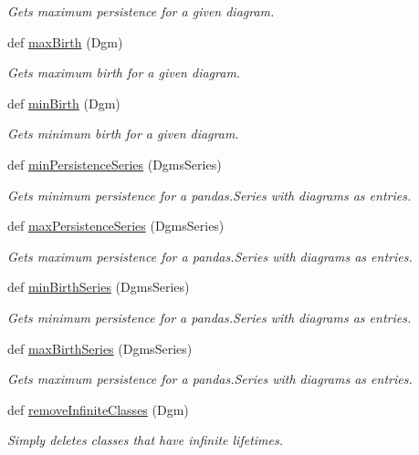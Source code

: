 \begin{DoxyCompactItemize}
\begin{DoxyCompactList}\small\item\em Gets maximum persistence for a given diagram. \end{DoxyCompactList}\item 
def \hyperlink{namespaceteaspoon_1_1_t_d_a_1_1_persistence_aa91a12cbd748fc2f13944fbc653739d1}{max\+Birth} (Dgm)
\begin{DoxyCompactList}\small\item\em Gets maximum birth for a given diagram. \end{DoxyCompactList}\item 
def \hyperlink{namespaceteaspoon_1_1_t_d_a_1_1_persistence_a4cb4a0b96d87e48f0d1170fd0252a9ae}{min\+Birth} (Dgm)
\begin{DoxyCompactList}\small\item\em Gets minimum birth for a given diagram. \end{DoxyCompactList}\item 
def \hyperlink{namespaceteaspoon_1_1_t_d_a_1_1_persistence_a5ce3d1bee444c695661556eb59f70d90}{min\+Persistence\+Series} (Dgms\+Series)
\begin{DoxyCompactList}\small\item\em Gets minimum persistence for a pandas.\+Series with diagrams as entries. \end{DoxyCompactList}\item 
def \hyperlink{namespaceteaspoon_1_1_t_d_a_1_1_persistence_a6413fcc8a65a5422547f264331eb5c7d}{max\+Persistence\+Series} (Dgms\+Series)
\begin{DoxyCompactList}\small\item\em Gets maximum persistence for a pandas.\+Series with diagrams as entries. \end{DoxyCompactList}\item 
def \hyperlink{namespaceteaspoon_1_1_t_d_a_1_1_persistence_a1db04f6a997b34a930bc3e28d2cb709e}{min\+Birth\+Series} (Dgms\+Series)
\begin{DoxyCompactList}\small\item\em Gets minimum persistence for a pandas.\+Series with diagrams as entries. \end{DoxyCompactList}\item 
def \hyperlink{namespaceteaspoon_1_1_t_d_a_1_1_persistence_a866a47a538d7042da1de685bed83d00e}{max\+Birth\+Series} (Dgms\+Series)
\begin{DoxyCompactList}\small\item\em Gets maximum persistence for a pandas.\+Series with diagrams as entries. \end{DoxyCompactList}\item 
\mbox{\label{namespaceteaspoon_1_1_t_d_a_1_1_persistence_abdeeb8bb1d1c2c82b26d2e55b0fd42a3}} 
def \hyperlink{namespaceteaspoon_1_1_t_d_a_1_1_persistence_abdeeb8bb1d1c2c82b26d2e55b0fd42a3}{remove\+Infinite\+Classes} (Dgm)
\begin{DoxyCompactList}\small\item\em Simply deletes classes that have infinite lifetimes. \end{DoxyCompactList}\end{DoxyCompactItemize}
